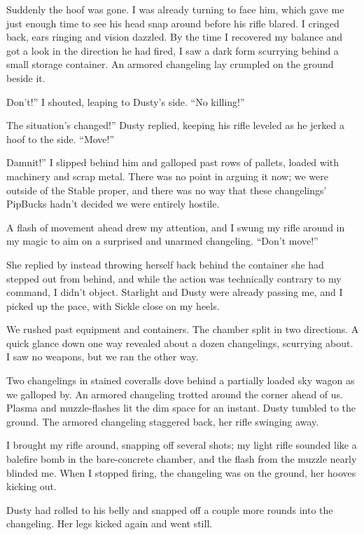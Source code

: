 Suddenly the hoof was gone. I was already turning to face him, which gave me just enough time to see his head snap around before his rifle blared. I cringed back, ears ringing and vision dazzled. By the time I recovered my balance and got a look in the direction he had fired, I saw a dark form scurrying behind a small storage container. An armored changeling lay crumpled on the ground beside it.

\leavevmode{}Don’t!” I shouted, leaping to Dusty’s side. “No killing!”

\leavevmode{}The situation’s changed!” Dusty replied, keeping his rifle leveled as he jerked a hoof to the side. “Move!”

\leavevmode{}Damnit!” I slipped behind him and galloped past rows of pallets, loaded with machinery and scrap metal. There was no point in arguing it now; we were outside of the Stable proper, and there was no way that these changelings’ PipBucks hadn’t decided we were entirely hostile.

A flash of movement ahead drew my attention, and I swung my rifle around in my magic to aim on a surprised and unarmed changeling. “Don’t move!”

She replied by instead throwing herself back behind the container she had stepped out from behind, and while the action was technically contrary to my command, I didn’t object. Starlight and Dusty were already passing me, and I picked up the pace, with Sickle close on my heels.

We rushed past equipment and containers. The chamber split in two directions. A quick glance down one way revealed about a dozen changelings, scurrying about. I saw no weapons, but we ran the other way.

Two changelings in stained coveralls dove behind a partially loaded sky wagon as we galloped by. An armored changeling trotted around the corner ahead of us. Plasma and muzzle-flashes lit the dim space for an instant. Dusty tumbled to the ground. The armored changeling staggered back, her rifle swinging away.

I brought my rifle around, snapping off several shots; my light rifle sounded like a balefire bomb in the bare-concrete chamber, and the flash from the muzzle nearly blinded me. When I stopped firing, the changeling was on the ground, her hooves kicking out.

Dusty had rolled to his belly and snapped off a couple more rounds into the changeling. Her legs kicked again and went still.

